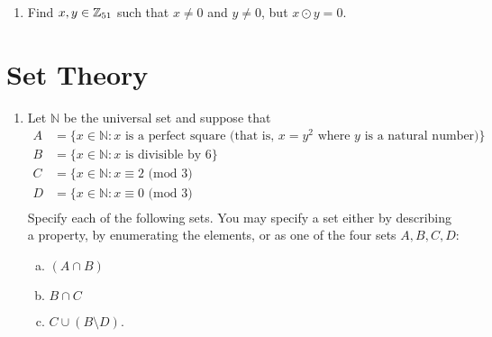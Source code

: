 \begin{enumerate}

\item
Find $x,y \in \mathbb{Z}_{51}$ such that $x \neq 0$ and $y \neq 0$, but $x \odot y = 0$.


\end{enumerate}


\section{Set Theory}

\begin{enumerate}

\item
Let ${\mathbb N}$ be the universal set and suppose that
\begin{align*}
A &= \{ x \in {\mathbb N} : x \text{ is a perfect square (that is, } x=y^2 \text{ where } y \text{ is a natural number)}\} \\ 
B &= \{ x \in {\mathbb N} : x \text{ is divisible by 6}\} \\ 
C &= \{ x \in {\mathbb N} : x  \equiv 2 \text{ (mod 3)} \\
D &= \{ x \in {\mathbb N} : x  \equiv 0 \text{ (mod 3)} \\
\end{align*} 
Specify each of the following sets. You may specify a set either by describing a property, by enumerating the elements, or as one of the four sets $A, B, C, D$:
\begin{enumerate}[(a)]
\item
$(A \cap B)$
\item
$B \cap C$
\item
$C \cup (B \setminus D)$.
\end{enumerate}





\end{enumerate}

